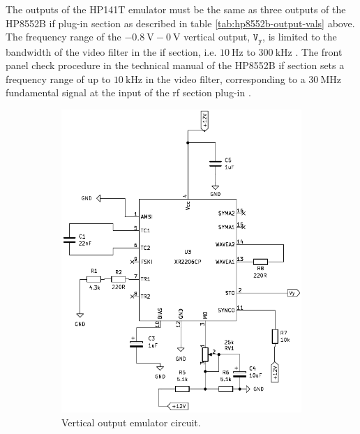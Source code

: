 \documentclass[class=report,11pt,crop=false]{standalone}
\begin{document}
	The outputs of the HP141T emulator must be the same as three outputs of the HP8552B \acrshort{if} plug-in section as described in table \ref{tab:hp8552b-output-vals} above. The frequency range of the $\SI{-0.8}{\volt}-\SI{0}{\volt}$ vertical output, $\texttt{V}_\texttt{y}$, is limited to the bandwidth of the video filter in the \acrshort{if} section, i.e. $\SI{10}{\hertz}$ to $\SI{300}{\kilo\hertz}$ \cite{hp8552b}. The front panel check procedure in the technical manual of the HP8552B \acrshort{if} section sets a frequency range of up to $\SI{10}{\kilo\hertz}$ in the video filter, corresponding to a $\SI{30}{\mega\hertz}$ fundamental signal at the input of the \acrshort{rf} section plug-in \cite{HP8555A}.  
	
	\begin{figure}[h!]
		\centering
		\begin{subfigure}{.5\textwidth}
			\centering
			\includegraphics[width=.8\linewidth]{Figures/Methodology/hp8552b-vertical-output-emulator-3}
			\caption{Vertical output emulator circuit.}
			\label{fig:vertical-output-emulator-ct-a}
		\end{subfigure}%
		\begin{subfigure}{.5\textwidth}
			\centering

\end{subfigure}
\end{figure}
\end{document}
